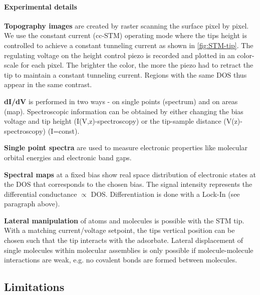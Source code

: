 \paragraph{Experimental details}

\textbf{Topography images} are created by raster scanning the surface pixel by pixel. 
We use the constant current (cc-STM) operating mode where the tips height is controlled to achieve a constant tunneling current as shown in \autoref{fig:STM-tip}. The regulating voltage on the height control piezo is recorded and plotted in an color-scale for each pixel. The brighter the color, the more the piezo had to retract the tip to maintain a constant tunneling current. Regions with the same DOS thus appear in the same contrast.


\textbf{dI/dV} is performed in two ways - on single points (spectrum) and on areas (map). Spectroscopic information can be obtained by either changing the bias voltage and tip height (I(V,z)-spectroscopy) or the tip-sample distance (V(z)-spectroscopy) (I=const).   

\textbf{Single point spectra} are used to measure electronic properties like molecular orbital energies and electronic band gaps.

\textbf{Spectral maps} at a fixed bias show real space distribution of electronic states at the DOS that corresponds to the chosen bias. The signal intensity represents the differential conductance $\propto$ DOS. Differentiation is done with a Lock-In (see paragraph above).

\textbf{Lateral manipulation} of atoms and molecules is possible with the STM tip. With a matching current/voltage setpoint, the tips vertical position can be chosen such that the tip interacts with the adsorbate. Lateral displacement of single molecules within molecular assemblies is only possible if molecule-molecule interactions are weak, e.g. no covalent bonds are formed between molecules. 

\subsection{Limitations}

